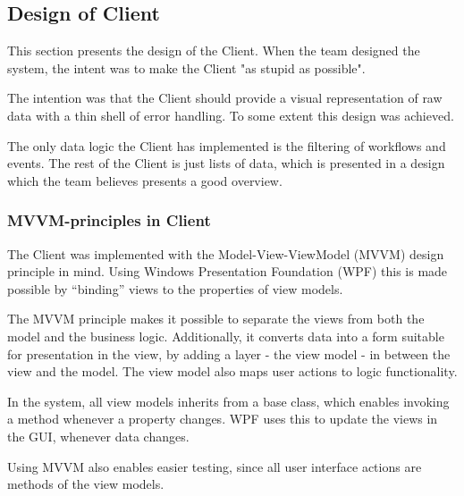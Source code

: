 \subsection{Design of Client}
This section presents the design of the Client. When the team designed the system, the intent was to make the Client "as stupid as possible".

The intention was that the Client should provide a visual representation of raw data with a thin shell of error handling. To some extent this design was achieved.

The only data logic the Client has implemented is the filtering of workflows and events.
The rest of the Client is just lists of data, which is presented in a design which the team believes presents a good overview. 

\subsubsection{MVVM-principles in Client}
The Client was implemented with the Model-View-ViewModel (MVVM) design principle in mind. Using Windows Presentation Foundation (WPF) this is made possible by “binding” views to the properties of view models.

The MVVM principle makes it possible to separate the views from both the model and the business logic. Additionally, it converts data into a form suitable for presentation in the view, by adding a layer - the view model - in between the view and the model. The view model also maps user actions to logic functionality.

In the system, all view models inherits from a base class, which enables invoking a method whenever a property changes. WPF uses this to update the views in the GUI, whenever data changes.

Using MVVM also enables easier testing, since all user interface actions are methods of the view models.